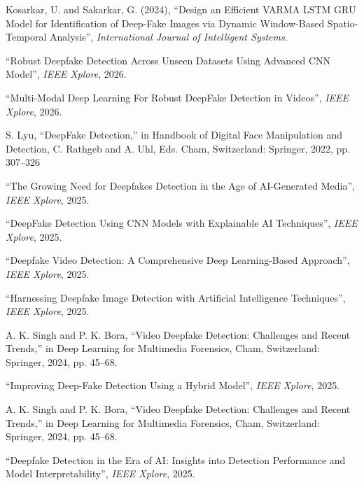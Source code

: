 \documentclass[12pt,a4paper]{report}
\begin{document}
\begin{enumerate}[label={[\arabic*]}]
\item Kosarkar, U. and Sakarkar, G. (2024), ``Design an Efficient VARMA LSTM GRU Model for Identification of Deep-Fake Images via Dynamic Window-Based Spatio-Temporal Analysis'', \textit{International Journal of Intelligent Systems}.

\item ``Robust Deepfake Detection Across Unseen Datasets Using Advanced CNN Model'', \textit{IEEE Xplore}, 2026.

\item ``Multi-Modal Deep Learning For Robust DeepFake Detection in Videos'', \textit{IEEE Xplore}, 2026.

\item S. Lyu, “DeepFake Detection,” in Handbook of Digital Face Manipulation and Detection, C. Rathgeb and A. Uhl, Eds. Cham, Switzerland: Springer, 2022, pp. 307–326

\item ``The Growing Need for Deepfakes Detection in the Age of AI-Generated Media'', \textit{IEEE Xplore}, 2025.

\item ``DeepFake Detection Using CNN Models with Explainable AI Techniques'', \textit{IEEE Xplore}, 2025.

\item ``Deepfake Video Detection: A Comprehensive Deep Learning-Based Approach'', \textit{IEEE Xplore}, 2025.

\item ``Harnessing Deepfake Image Detection with Artificial Intelligence Techniques'', \textit{IEEE Xplore}, 2025.

\item A. K. Singh and P. K. Bora, “Video Deepfake Detection: Challenges and Recent Trends,” in Deep Learning for Multimedia Forensics, Cham, Switzerland: Springer, 2024, pp. 45–68.

\item ``Improving Deep-Fake Detection Using a Hybrid Model'', \textit{IEEE Xplore}, 2025.

\item A. K. Singh and P. K. Bora, “Video Deepfake Detection: Challenges and Recent Trends,” in Deep Learning for Multimedia Forensics, Cham, Switzerland: Springer, 2024, pp. 45–68.

\item ``Deepfake Detection in the Era of AI: Insights into Detection Performance and Model Interpretability'', \textit{IEEE Xplore}, 2025.


\end{enumerate}
\end{document}
